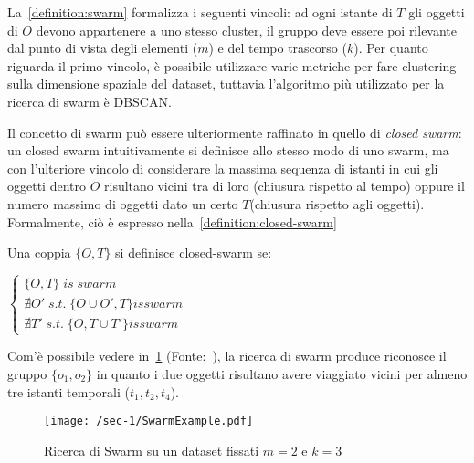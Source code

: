 La~\cref{definition:swarm} formalizza i seguenti vincoli:
ad ogni istante di \(T\) gli oggetti di \(O\) devono appartenere a uno stesso cluster,
il gruppo deve essere poi rilevante dal punto di vista degli elementi (\(m\)) e del tempo trascorso
(\(k\)).
Per quanto riguarda il primo vincolo, è possibile utilizzare varie metriche per fare clustering
sulla dimensione spaziale del dataset, tuttavia l'algoritmo più utilizzato per la ricerca di swarm
è DBSCAN\@.


Il concetto di swarm può essere ulteriormente raffinato in quello di \textit{closed swarm}:
un closed swarm intuitivamente si definisce allo stesso modo di uno swarm, ma con l'ulteriore
vincolo di considerare la massima sequenza di istanti in cui gli oggetti dentro \(O\) risultano vicini
tra di loro (chiusura rispetto al tempo) oppure il numero massimo di oggetti dato un certo \(T\)(chiusura rispetto agli oggetti).
Formalmente, ciò è espresso nella~\cref{definition:closed-swarm}

\begin{definition}\label{definition:closed-swarm}

  Una coppia \( \{ O, T \} \) si definisce closed-swarm se:

  \begin{center}

    \(
      \begin{cases}
         \{ O, T \} \; is \; swarm   \\
         \nexists O' \; s.t. \;  \{ O \cup O', T \} is swarm   \\
         \nexists T' \; s.t. \;  \{ O, T \cup T' \} is swarm
      \end{cases}
    \)

  \end{center}

\end{definition}

Com'è possibile vedere in~\cref{fig:chap-1:SwarmExample} (Fonte:~\cite{phan2016all}), la ricerca di swarm produce riconosce
il gruppo \( \{ o_{1}, o_{2}\} \) in quanto i due oggetti risultano avere viaggiato vicini per almeno
tre istanti temporali (\(t_{1}, t_{2}, t_{4}\)).

\begin{figure}
  \centering
  \texttt{[image: /sec-1/SwarmExample.pdf]}
  \caption{Ricerca di Swarm su un dataset fissati \(m=2\) e \(k=3\)}%
  \label{fig:chap-1:SwarmExample}
\end{figure}


